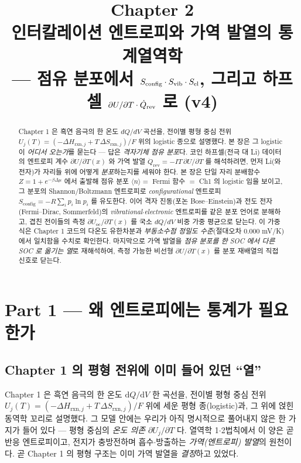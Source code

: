 \documentclass[11pt,a4paper]{article}
\title{\textbf{\LARGE Chapter 2}\\[0.35em]\Large 인터칼레이션 엔트로피와 가역 발열의 통계열역학\\[0.2em]\large — 점유 분포에서 $S_\cfg\cdot S_\vib\cdot S_\elc$, 그리고 하프셀 $\partial U/\partial T\cdot\dot Q_\rev$ 로 (v4)}
\author{}\date{}
\newcommand{\dd}{\mathrm{d}}
\newcommand{\rxn}{\mathrm{rxn}}
\newcommand{\rev}{\mathrm{rev}}
\newcommand{\oc}{\mathrm{oc}}
\newcommand{\cfg}{\mathrm{config}}
\newcommand{\avg}[1]{\langle #1\rangle}
\begin{document}
\maketitle

\begin{abstract}
\noindent
Chapter 1 은 흑연 음극의 한 온도 $dQ/dV$ 곡선을, 전이별 평형 중심 전위
$U_j(T)=(-\Delta H_{\rxn,j}+T\,\Delta S_{\rxn,j})/F$ 위의 logistic 종으로 설명했다. 본 장은 그 logistic
이 \emph{어디서 오는가}를 묻는다 — 답은 \emph{격자기체 점유 분포}다. 코인 하프셀(전극 대 Li) 데이터의
엔트로피 계수 $\partial U/\partial T(x)$ 와 가역 발열 $\dot Q_\rev=-IT\,\partial U/\partial T$ 를 해석하려면,
먼저 Li(와 전자)가 자리들 위에 어떻게 \emph{분포}하는지를 세워야 한다. 본 장은 단일 자리 분배함수
$Z=1+e^{-\beta\Delta\mu}$ 에서 출발해 점유 분포 $\avg n=$ Fermi 함수 $=$ Ch1 의 logistic 임을 보이고,
그 분포의 Shannon/Boltzmann 엔트로피로 \emph{configurational} 엔트로피
$S_\cfg=-R\sum_i p_i\ln p_i$ 를 유도한다. 이어 격자 진동(포논 Bose--Einstein)과 전도 전자
(Fermi--Dirac, Sommerfeld)의 \emph{vibrational}$\cdot$\emph{electronic} 엔트로피를 같은 분포 언어로
분해하고, 겹친 전이들의 측정 $\partial U_\oc/\partial T(x)$ 를 국소 $dQ/dV$ 비중 가중 평균으로 닫는다.
이 가중식은 Chapter 1 코드의 다온도 유한차분과 \emph{부동소수점 정밀도 수준}(절대오차 $0.000$ mV/K)에서
일치함을 수치로 확인한다. 마지막으로 가역 발열을 \emph{점유 분포를 한 SOC 에서 다른 SOC 로 옮기는 열}로
재해석하여, 측정 가능한 비선형 $\partial U/\partial T(x)$ 를 분포 재배열의 직접 신호로 닫는다.
\end{abstract}

\section*{Part 1 — 왜 엔트로피에는 통계가 필요한가}

\subsection{Chapter 1 의 평형 전위에 이미 들어 있던 ``열''}\label{sec:intro}
Chapter 1 은 흑연 음극의 한 온도 $\dd Q/\dd V$ 한 곡선을, 전이별 평형 중심 전위
$U_j(T)=(-\Delta H_{\rxn,j}+T\,\Delta S_{\rxn,j})/F$ 위에 세운 평형 종(logistic)과, 그 위에 얹힌 동역학
꼬리로 설명했다. 그 모델 안에는 우리가 아직 명시적으로 풀어내지 않은 한 가지가 들어 있다 — 평형 중심의
\emph{온도 의존} $\partial U_j/\partial T$ 다. 열역학 1$\cdot$2법칙에서 이 양은 곧 반응 엔트로피이고,
전지가 충방전하며 흡수$\cdot$방출하는 \emph{가역(엔트로피) 발열}의 원천이다. 곧 Chapter 1 의 평형 구조는
이미 가역 발열을 \emph{결정}하고 있었다.
\end{document}
